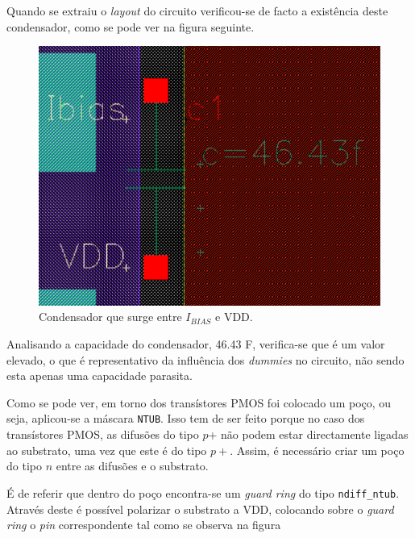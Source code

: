 \documentclass[11pt]{article}
\numberwithin{equation}{section}
\begin{document}
Quando se extraiu o \textit{layout} do circuito verificou-se de facto a existência deste condensador, como se pode ver na figura seguinte. 

\begin{figure}[H]
	\centering
	\includegraphics[keepaspectratio=true, scale=0.35]{exps/condensador1}
	\vspace{-0.5em}
	\caption{Condensador que surge entre $I_{BIAS}$ e VDD.}
	\vspace{-0.8em}
\end{figure}

Analisando a capacidade do condensador, 46.43 F, verifica-se que é um valor elevado, o que é representativo da influência dos \textit{dummies} no circuito, não sendo esta apenas uma capacidade parasita.

Como se pode ver, em torno dos transístores PMOS foi colocado um poço, ou seja, aplicou-se a máscara \texttt{NTUB}. Isso tem de ser feito porque no caso dos transístores PMOS, as difusões do tipo $p$+ não podem estar directamente ligadas ao substrato, uma vez que este é do tipo $p+$. Assim, é necessário criar um poço do tipo $n$ entre as difusões e o substrato.

É de referir que dentro do poço encontra-se um \textit{guard ring} do tipo \texttt{ndiff\_ntub}. Através deste é possível polarizar o substrato a VDD, colocando sobre o \textit{guard ring} o \textit{pin} correspondente tal como se observa na figura
\end{document}
